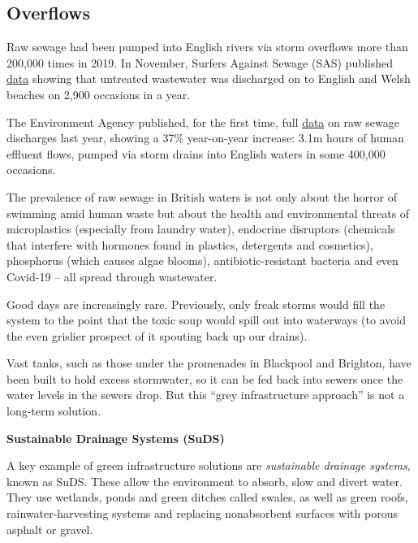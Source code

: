 \documentclass[
]{book}
\begin{document}
\hypertarget{overflows}{%
\subsection{Overflows}\label{overflows}}

Raw sewage had been pumped into English rivers via storm overflows more than 200,000 times in 2019. In November, Surfers Against Sewage (SAS) published \href{https://www.theguardian.com/environment/2020/nov/06/raw-sewage-dumped-into-english-and-welsh-beaches-2900-times-this-year}{data} showing that untreated wastewater was discharged on to English and Welsh beaches on 2,900 occasions in a year.

The Environment Agency published, for the first time, full \href{https://www.theguardian.com/environment/2021/mar/31/water-firms-discharged-raw-sewage-into-english-waters-400000-times-last-year}{data} on raw sewage discharges last year, showing a 37\% year-on-year increase: 3.1m hours of human effluent flows, pumped via storm drains into English waters in some 400,000 occasions.

The prevalence of raw sewage in British waters is not only about the horror of swimming amid human waste but about the health and environmental threats of microplastics (especially from laundry water), endocrine disruptors (chemicals that interfere with hormones found in plastics, detergents and cosmetics), phosphorus (which causes algae blooms), antibiotic-resistant bacteria and even Covid-19 -- all spread through wastewater.

Good days are increasingly rare. Previously, only freak storms would fill the system to the point that the toxic soup would spill out into waterways (to avoid the even grislier prospect of it spouting back up our drains).

Vast tanks, such as those under the promenades in Blackpool and Brighton, have been built to hold excess stormwater, so it can be fed back into sewers once the water levels in the sewers drop. But this ``grey infrastructure approach'' is not a long-term solution.

\textbf{Sustainable Drainage Systems (SuDS)}

A key example of green infrastructure solutions are \emph{sustainable drainage systems}, known as SuDS. These allow the environment to absorb, slow and divert water. They use wetlands, ponds and green ditches called swales, as well as green roofs, rainwater-harvesting systems and replacing nonabsorbent surfaces with porous asphalt or gravel.
\end{document}
